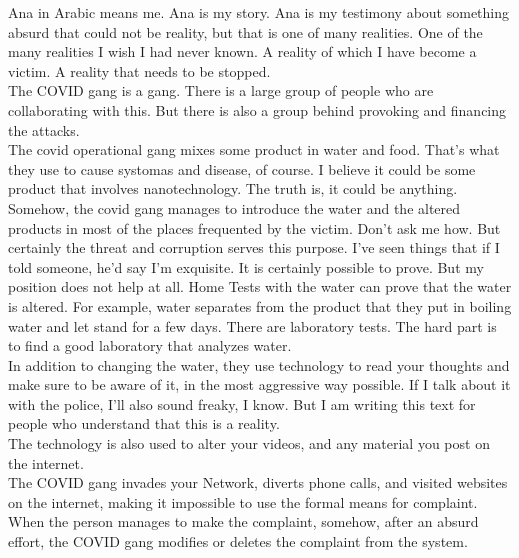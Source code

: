 \documentclass[11pt]{book}
\begin{document}
\noindent Ana in Arabic means me. Ana is my story. Ana is my testimony about something absurd that could not be reality, but that is one of many realities. One of the many realities I wish I had never known. A reality of which I have become a victim. A reality that needs to be stopped. \\

\noindent The COVID gang is a gang. There is a large group of people who are collaborating with this. But there is also a group behind provoking and financing the attacks. \\

\noindent The covid operational gang mixes some product in water and food. That's what they use to cause systomas and disease, of course. I believe it could be some product that involves nanotechnology. The truth is, it could be anything. Somehow, the covid gang manages to introduce the water and the altered products in most of the places frequented by the victim. Don't ask me how. But certainly the threat and corruption serves this purpose. I've seen things that if I told someone, he'd say I'm exquisite. It is certainly possible to prove. But my position does not help at all. Home Tests with the water can prove that the water is altered. For example, water separates from the product that they put in boiling water and let stand for a few days. There are laboratory tests. The hard part is to find a good laboratory that analyzes water. \\

\noindent In addition to changing the water, they use technology to read your thoughts and make sure to be aware of it, in the most aggressive way possible. If I talk about it with the police, I'll also sound freaky, I know. But I am writing this text for people who understand that this is a reality. \\

\noindent The technology is also used to alter your videos, and any material you post on the internet. \\

\noindent The COVID gang invades your Network, diverts phone calls, and visited websites on the internet, making it impossible to use the formal means for complaint. \\

\noindent When the person manages to make the complaint, somehow, after an absurd effort, the COVID gang modifies or deletes the complaint from the system. \\
\end{document}
